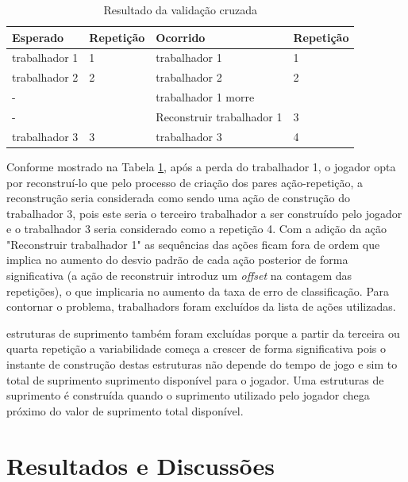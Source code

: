 \begin{table}[H]
\centering
\caption{Resultado da validação cruzada}
\label{tab:implementacao-reordenamento-workers}
\begin{tabular}{l|l||l|l}
Esperado              & Repetição & Ocorrido                  & Repetição \\ \hline
\Gls{trabalhador} 1 & 1         & \Gls{trabalhador} 1     & 1         \\
\Gls{trabalhador} 2 & 2         & \Gls{trabalhador} 2     & 2         \\
-                     &           & \Gls{trabalhador} 1 morre       &           \\
-                     &           & Reconstruir \gls{trabalhador} 1 & 3         \\
\Gls{trabalhador} 3 & 3         & \Gls{trabalhador} 3     & 4
\end{tabular}
\end{table}

Conforme mostrado na Tabela \ref{tab:implementacao-reordenamento-workers}, após a perda do \gls{trabalhador} 1, o jogador opta por reconstruí-lo que pelo processo de criação dos pares ação-repetição, a reconstrução seria considerada como sendo uma ação de construção do \gls{trabalhador} 3, pois este seria o terceiro \gls{trabalhador} a ser construído pelo jogador e o \gls{trabalhador} 3 seria considerado como a repetição 4. Com a adição da ação "Reconstruir \Gls{trabalhador} 1" as sequências das ações ficam fora de ordem que implica no aumento do desvio padrão de cada ação posterior de forma significativa (a ação de reconstruir introduz um \textit{offset} na contagem das repetições), o que implicaria no aumento da taxa de erro de classificação. Para contornar o problema, \glspl{trabalhador} foram excluídos da lista de ações utilizadas.

\Glspl{estrutura} de \gls{suprimento} também foram excluídas porque a partir da terceira ou quarta repetição a variabilidade começa a crescer de forma significativa pois o instante de construção destas \glspl{estrutura} não depende do tempo de jogo e sim to total de suprimento \gls{suprimento} disponível para o jogador. Uma \glspl{estrutura} de \gls{suprimento} é construída quando o \gls{suprimento} utilizado pelo jogador chega próximo do valor de \gls{suprimento} total disponível.

	\chapter{Resultados e Discussões}

